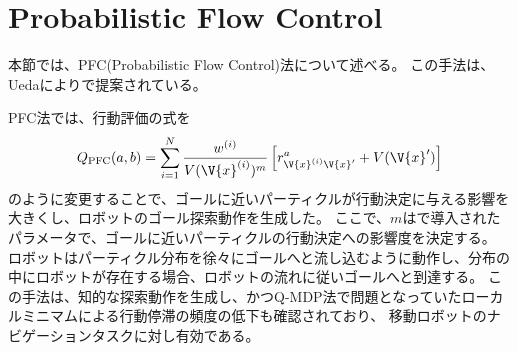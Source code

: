 \section{Probabilistic Flow Control} \label{section:PFC法}
本節では、PFC(Probabilistic Flow Control)法について述べる。
この手法は、Uedaにより\cite{ueda2015}で提案されている。

PFC法では、行動評価の式を
\begin{equation}
\label{equation:pfc}
  Q_{\rm PFC}(a, b) = \sum_{i=1}^{N} \frac{ w^{(i)} }{ V(\V{x}^{(i)})^{m} }
                      \left[r^{a}_{\V{x}^{(i)} \V{x}^{\prime}} + V(\V{x}^{\prime}) \right]
\end{equation}
のように変更することで、ゴールに近いパーティクルが行動決定に与える影響を大きくし、ロボットのゴール探索動作を生成した。
ここで、$m$は\cite{ueda2018searching}で導入されたパラメータで、ゴールに近いパーティクルの行動決定への影響度を決定する。
ロボットはパーティクル分布を徐々にゴールへと流し込むように動作し、分布の中にロボットが存在する場合、ロボットの流れに従いゴールへと到達する。
この手法は、知的な探索動作を生成し、かつQ-MDP法で問題となっていたローカルミニマムによる行動停滞の頻度の低下も確認されており、
移動ロボットのナビゲーションタスクに対し有効である。

